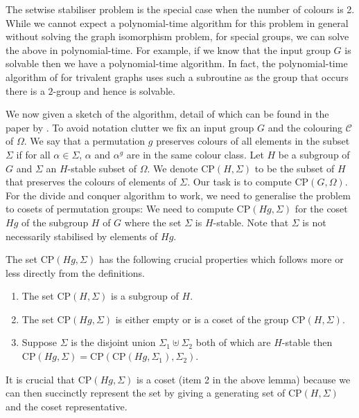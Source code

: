 \documentclass{article}
\newcommand{\CP}[2]{\ensuremath{\mathrm{CP}\left(#1,#2\right)}}
\begin{document}
The setwise stabiliser problem is the special case when the number of
colours is 2. While we cannot expect a polynomial-time algorithm for
this problem in general without solving the graph isomorphism problem,
for special groups, we can solve the above in polynomial-time. For
example, if we know that the input group $G$ is solvable then we have
a polynomial-time algorithm. In fact, the polynomial-time algorithm of
\citet{luks82bounded} for trivalent graphs uses such a subroutine as
the group that occurs there is a $2$-group and hence is solvable.

We now given a sketch of the algorithm, detail of which can be found
in the paper by \citet{luks82bounded}. To avoid notation clutter we
fix an input group $G$ and the colouring $\mathcal{C}$ of $\Omega$.
We say that a permutation $g$ preserves colours of all elements in the
subset $\Sigma$ if for all $\alpha \in \Sigma$, $\alpha$ and
$\alpha^g$ are in the same colour class. Let $H$ be a subgroup of $G$
and $\Sigma$ an $H$-stable subset of $\Omega$. We denote
$\CP{H}{\Sigma}$ to be the subset of $H$ that preserves the colours of
elements of $\Sigma$. Our task is to compute $\CP{G}{\Omega}$. For the
divide and conquer algorithm to work, we need to generalise the
problem to cosets of permutation groups: We need to compute
$\CP{Hg}{\Sigma}$ for the coset $Hg$ of the subgroup $H$ of $G$ where
the set $\Sigma$ is $H$-stable. Note that $\Sigma$ is not necessarily
stabilised by elements of $Hg$.

The set $\CP{Hg}{\Sigma}$ has the following crucial properties
which follows more or less directly from the definitions.

\begin{lemma}
  \begin{enumerate}
  \item The set $\CP{H}{\Sigma}$ is a subgroup of $H$.
  \item The set $\CP{Hg}{\Sigma}$ is either empty or is a coset of the
    group $\CP{H}{\Sigma}$.
  \item Suppose $\Sigma$ is the disjoint union $\Sigma_1 \uplus
    \Sigma_2$ both of which are $H$-stable then $\CP{Hg}{\Sigma} =
    \CP{\CP{Hg}{\Sigma_1}}{\Sigma_2}$.
  \end{enumerate}
\end{lemma}

It is crucial that $\CP{Hg}{\Sigma}$ is a coset (item 2 in the above
lemma) because we can then succinctly represent the set by giving a
generating set of $\CP{H}{\Sigma}$ and the coset representative.
\end{document}
